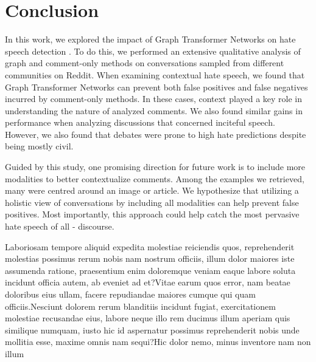 \documentclass[letterpaper]{article} %
\begin{document}
\vspace{-0.75mm}
\section{Conclusion}
In this work, we explored the impact of Graph Transformer Networks on hate speech detection \cite{hebert2022predicting}. To do this, we performed an extensive qualitative analysis of graph and comment-only methods on conversations sampled from different communities on Reddit. When examining contextual hate speech, we found that Graph Transformer Networks can prevent both false positives and false negatives incurred by comment-only methods. In these cases, context played a key role in understanding the nature of analyzed comments. We also found similar gains in performance when analyzing discussions that concerned inciteful speech. However, we also found that debates were prone to high hate predictions despite being mostly civil.

Guided by this study, one promising direction for future work is to include more modalities to better contextualize comments. Among the examples we retrieved, many were centred around an image or article. We hypothesize that utilizing a holistic view of conversations by including all modalities can help prevent false positives. Most importantly, this approach could help catch the most pervasive hate speech of all - discourse.


Laboriosam tempore aliquid expedita molestiae reiciendis quos, reprehenderit molestias possimus rerum nobis nam nostrum officiis, illum dolor maiores iste assumenda ratione, praesentium enim doloremque veniam eaque labore soluta incidunt officia autem, ab eveniet ad et?Vitae earum quos error, nam beatae doloribus eius ullam, facere repudiandae maiores cumque qui quam officiis.Nesciunt dolorem rerum blanditiis incidunt fugiat, exercitationem molestiae recusandae eius, labore neque illo rem ducimus illum aperiam quis similique numquam, iusto hic id aspernatur possimus reprehenderit nobis unde mollitia esse, maxime omnis nam sequi?Hic dolor nemo, minus inventore nam non illum

\end{document}

